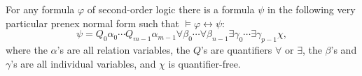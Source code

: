 For any formula $\varphi$ of second-order logic there is a formula $\psi$ in the following very particular prenex normal form such that $\models \varphi \leftrightarrow \psi$:
$$\psi = Q_0 \alpha_0 \cdots Q_{m-1} \alpha_{m-1} \forall \beta_0 \cdots \forall \beta_{n-1} \exists \gamma_0 \cdots \exists \gamma_{p-1} \chi,$$
where the $\alpha$'s are all relation variables, the $Q$'s are quantifiers $\forall$ or $\exists$, the $\beta$'s and $\gamma$'s are all individual variables, and $\chi$ is quantifier-free.
